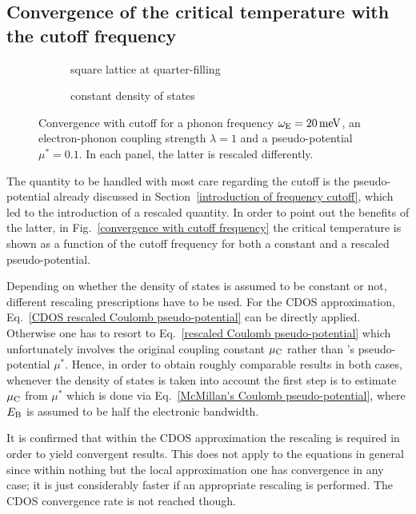 \subsection{Convergence of the critical temperature with the cutoff frequency}

\begin{figure}
    \small
    \begin{subfigure}{7cm}
        
        \caption{square lattice at quarter-filling}
    \end{subfigure}%
    \begin{subfigure}{7cm}
        
        \caption{constant density of states}
    \end{subfigure}
    \caption[Convergence with cutoff frequency]{
        Convergence with cutoff for a phonon frequency $\omega \sb{\text{E}} = 20 \,
        \mathrm{meV}$, an electron-phonon coupling strength $\lambda = 1$ and a
         pseudo-potential $\mu^* = 0.1$. In each panel, the latter
        is rescaled differently.}
    \label{convergence with cutoff frequency}
\end{figure}
%
The quantity to be handled with most care regarding the cutoff is the
 pseudo-potential already discussed in Section~\ref{introduction
of frequency cutoff}, which led to the introduction of a rescaled quantity. In
order to point out the benefits of the latter, in Fig.~\ref{convergence with
cutoff frequency} the critical temperature is shown as a function of the cutoff
frequency for both a constant and a rescaled  pseudo-potential.

Depending on whether the density of states is assumed to be constant or not,
different rescaling prescriptions have to be used. For the CDOS approximation,
Eq.~\ref{CDOS rescaled Coulomb pseudo-potential} can be directly applied.
Otherwise one has to resort to Eq.~\ref{rescaled Coulomb pseudo-potential} which
unfortunately involves the original coupling constant $\mu \sb{\text{C}}$ rather than
's  pseudo-potential $\mu^*$. Hence, in order to
obtain roughly comparable results in both cases, whenever the density of states
is taken into account the first step is to estimate $\mu \sb{\text{C}}$ from $\mu^*$
which is done via Eq.~\ref{McMillan's Coulomb pseudo-potential}, where $E \sb{\text{B}}$ is assumed to be half the electronic bandwidth.

It is confirmed that within the CDOS approximation the rescaling is required in
order to yield convergent results. This does not apply to the 
equations in general since within nothing but the local approximation one has
convergence in any case; it is just considerably faster if an appropriate
rescaling is performed. The CDOS convergence rate is not reached though.

